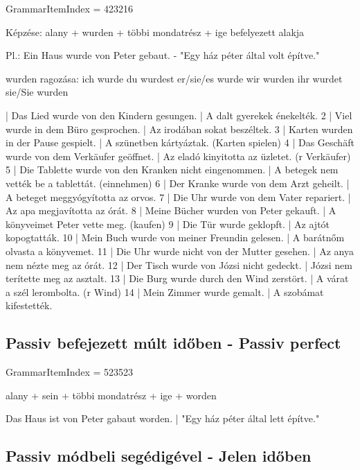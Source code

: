 \documentclass{article}
\newenvironment{desc}{\verbatim}{\endverbatim}
\newenvironment{exmp}{\verbatim}{\endverbatim}
\begin{document}
GrammarItemIndex = 423216

\begin{desc}
Képzése: alany + wurden + többi mondatrész + ige befelyezett alakja

Pl.: Ein Haus wurde von Peter gebaut. - "Egy ház péter által volt építve."

wurden ragozása:
ich wurde
du wurdest
er/sie/es wurde
wir wurden
ihr wurdet
sie/Sie wurden
\end{desc}

\begin{exmp}
1 | Das Lied wurde von den Kindern gesungen. | A dalt gyerekek énekelték.
2 | Viel wurde in dem Büro gesprochen. | Az irodában sokat beszéltek.
3 | Karten wurden in der Pause gespielt. | A szünetben kártyáztak. (Karten spielen)
4 | Das Geschäft wurde von dem Verkäufer geöffnet. | Az eladó kinyitotta az üzletet. (r Verkäufer)
5 | Die Tablette wurde von den Kranken nicht eingenommen. | A betegek nem vették be a tablettát. (einnehmen)
6 | Der Kranke wurde von dem Arzt geheilt. | A beteget meggyógyította az orvos.
7 | Die Uhr wurde von dem Vater repariert. | Az apa megjavította az órát.
8 | Meine Bücher wurden von Peter gekauft. | A könyveimet Peter vette meg. (kaufen)
9 | Die Tür wurde geklopft. | Az ajtót kopogtatták.
10 | Mein Buch wurde von meiner Freundin gelesen. | A barátnőm olvasta a könyvemet.
11 | Die Uhr wurde nicht von der Mutter gesehen. | Az anya nem nézte meg az órát.
12 | Der Tisch wurde von Józsi nicht gedeckt. | Józsi nem terítette meg az asztalt.
13 | Die Burg wurde durch den Wind zerstört. | A várat a szél lerombolta. (r Wind)
14 | Mein Zimmer wurde gemalt. | A szobámat kifestették.
\end{exmp}

\subsection{Passiv befejezett múlt időben - Passiv perfect}

GrammarItemIndex = 523523

\begin{desc}
alany + sein + többi mondatrész + ige + worden

Das Haus ist von Peter gabaut worden. | "Egy ház péter által lett építve."
\end{desc}

\begin{exmp}
\end{exmp}

\subsection{Passiv módbeli segédigével - Jelen időben}
\end{document}
